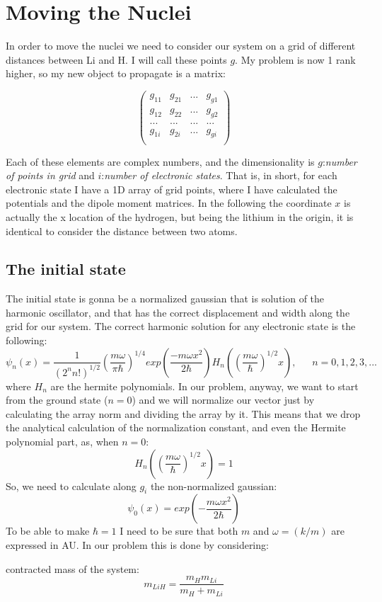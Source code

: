 \section{Moving the Nuclei}
In order to move the nuclei we need to consider our system on a grid of different distances between Li and H. I will call these points $g$. My problem is now 1 rank higher, so my new object to propagate is a matrix:

\begin{equation}
\begin{pmatrix*}
 g_{11} & g_{21} & ... & g_{g1} \\
 g_{12} & g_{22} & ... & g_{g2} \\
 ... & ... & ... & ... \\
 g_{1i} & g_{2i} & ... & g_{gi}\\
\end{pmatrix*}
\end{equation}

Each of these elements are complex numbers, and the dimensionality is $g$:\textit{number of points in grid} and $i$:\textit{number of electronic states}. That is, in short, for each electronic state I have a 1D array of grid points, where I have calculated the potentials and the dipole moment matrices. In the following the coordinate $x$ is actually the x location of the hydrogen, but being the lithium in the origin, it is identical to consider the distance between two atoms.

\subsection{The initial state}
The initial state is gonna be a normalized gaussian that is solution of the harmonic oscillator, and that has the correct displacement and width along the grid for our system. The correct harmonic solution for any electronic state is the following:
\begin{equation}
\psi_n(x)=\dfrac{1}{(2^n n!)^{1/2}}\left(\dfrac{m\omega}{\pi\hbar}\right)^{1/4}exp\left(\dfrac{-m\omega x^2}{2\hbar}\right)H_n \left( \left( \dfrac{m\omega}{\hbar}\right)^{1/2}x \right),\ \ \ \ \ \ \ n=0,1,2,3, ...
\end{equation}
where $H_n$ are the hermite polynomials. In our problem, anyway, we want to start from the ground state ($n=0$) and we will normalize our vector just by calculating the array norm and dividing the array by it. This means that we drop the analytical calculation of the normalization constant, and even the Hermite polynomial part, as, when $n=0$: $$H_n \left( \left( \dfrac{m\omega}{\hbar}\right)^{1/2}x \right)=1$$
So, we need to calculate along $g_i$ the non-normalized gaussian:
\begin{equation}
\psi_0(x) = exp\left(-\dfrac{m\omega x^2}{2\hbar}\right)
\end{equation}
To be able to make $\hbar=1$ I need to be sure that both $m$ and $\omega=(k/m)$ are expressed in AU. In our problem this is done by considering:
\bee
\item contracted mass of the system:    
\begin{equation}\label{ciao}
m_{LiH} = \dfrac{m_H m_{Li}}{m_H + m_{Li}} 
\end{equation}

